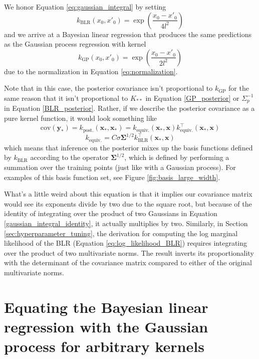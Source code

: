 \documentclass{article}
\begin{document}
We honor Equation \ref{eq:gaussian_integral} by setting
\begin{equation}
    k_\text{BLR}(x_0,x'_0)=\exp\left(\frac{x_0-x'_0}{4l^2}\right)
\end{equation}and we arrive at a Bayesian linear regression that produces the same predictions as the Gaussian process regression with kernel
\begin{equation}
    k_\text{GP}(x_0,x'_0)=\exp\left(\frac{x_0-x'_0}{2l^2}\right)
\end{equation} due to the normalization in Equation \ref{eq:normalization}.

Note that in this case, the posterior covariance isn't proportional to $k_\text{GP}$ for the same reason that it isn't proportional to $K_{\ast\ast}$ in Equation \ref{GP_posterior} or $\Sigma_p^{-1}$ in Equation \ref{BLR_posterior}. Rather, if we describe the posterior covariance as a pure kernel function, it would look something like 
\begin{equation}
    \text{cov}(\mathbf{y_\ast})= k_\text{post.}(\mathbf{x}_\ast,\mathbf{x}_\ast) =
    k_\text{equiv.}(\mathbf{x}_\ast,\mathbf{x}) k_\text{equiv.}^\top(\mathbf{x}_\ast,\mathbf{x})
\end{equation}\begin{equation}
\label{equivalen_kernel}
    k_\text{equiv.} = C\sigma\boldsymbol{\Sigma}^{1/2}k_\text{BLR}^\top(\mathbf{x}_\ast,\mathbf{x})
\end{equation}which means that inference on the posterior mixes up the basis functions defined by $k_\text{BLR}$ according to the operator $\boldsymbol{\Sigma}^{1/2}$, which is defined by performing a summation over the training points (just like with a Gaussian process).  For examples of this basis function set, see Figure \ref{fig:basis_large_width}.

What's a little weird about this equation is that it implies our covariance matrix would see its exponents divide by two due to the square root, but because of the identity of integrating over the product of two Gaussians in Equation \ref{gaussian_integral_identity}, it actually multiplies by two. Similarly, in Section \ref{sec:hyperparameter_tuning}, the derivation for computing the log marginal likelihood of the BLR (Equation \ref{eq:log_likelihood_BLR}) requires integrating over the product of two multivariate norms. The result inverts its proportionality with the determinant of the covariance matrix compared to either of the original multivariate norms.

\section{Equating the Bayesian linear regression with the Gaussian process for arbitrary kernels}
\end{document}
